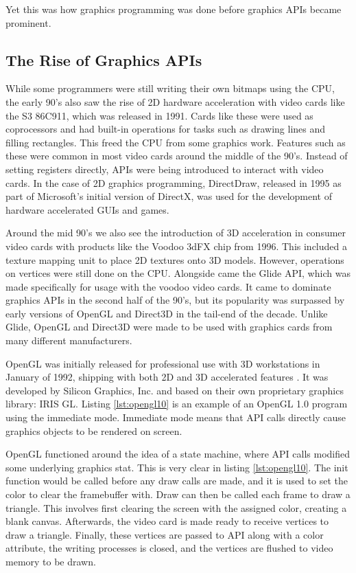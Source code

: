 Yet this was how graphics programming was done before graphics \glspl{API} became prominent.


\subsection{The Rise of Graphics \acs{API}s} 
While some programmers were still writing their own bitmaps using the \gls{CPU}, the early 90’s also saw the rise of 2D hardware acceleration with video cards like the S3 86C911, which was released in 1991.
Cards like these were used as coprocessors and had built-in operations for tasks such as drawing lines and filling rectangles.
This freed the \gls{CPU} from some graphics work. 
Features such as these were common in most video cards around the middle of the 90’s. Instead of setting registers directly, \glspl{API} were being introduced to interact with video cards. 
In the case of 2D graphics programming, DirectDraw, released in 1995 as part of Microsoft’s initial version of DirectX, was used for the development of hardware accelerated \glspl{GUI} and games. \cite{ wikiGpu}


Around the mid 90’s we also see the introduction of 3D acceleration in consumer video cards with products like the Voodoo 3dFX chip from 1996.
This included a texture mapping unit to place 2D textures onto 3D models.
However, operations on vertices were still done on the \gls{CPU}. 
Alongside came the Glide \gls{API}, which was made specifically for usage with the voodoo video cards.
It came to dominate graphics \glspl{API} in the second half of the 90's, but its popularity was surpassed by early versions of OpenGL and Direct3D in the tail-end of the decade. 
Unlike Glide, OpenGL and Direct3D were made to be used with graphics cards from many different manufacturers. \cite{wiki3dfxInteractive}


OpenGL was initially released for professional use with 3D workstations in January of 1992, shipping with both 2D and 3D accelerated features \cite{segal1994opengl}. 
It was developed by Silicon Graphics, Inc. and based on their own proprietary graphics library: \gls{IRIS GL}. 
Listing \ref{lst:opengl10} is an example of an OpenGL 1.0 program using the immediate mode. 
Immediate mode means that \gls{API} calls directly cause graphics objects to be rendered on screen.


OpenGL functioned around the idea of a state machine, where \gls{API} calls modified some underlying graphics stat.
This is very clear in listing \ref{lst:opengl10}.
The init function would be called before any draw calls are made, and it is used to set the color to clear the framebuffer with. 
Draw can then be called each frame to draw a triangle. 
This involves first clearing the screen with the assigned color, creating a blank canvas. 
Afterwards, the video card is made ready to receive vertices to draw a triangle. 
Finally, these vertices are passed to \gls{API} along with a color attribute, the writing processes is closed, and the vertices are flushed to video memory to be drawn.\cite{segal1994opengl}


